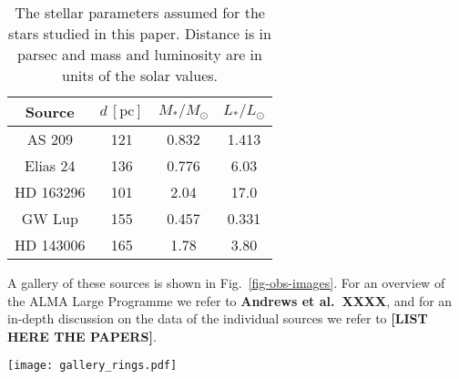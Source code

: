 \documentclass{aa}
\begin{document}
\begin{table}
\begin{center}
\begin{tabular}{|c|ccc|}
\hline
\hline
Source     & $d\,\mathrm{[pc]}$ & $M_{*}/M_{\odot}$ & $L_{*}/L_{\odot}$ \\
\hline
AS 209     & 121              & 0.832        &  1.413 \\ %
Elias 24   & 136              & 0.776        &  6.03  \\ %
HD 163296  & 101              & 2.04         &  17.0  \\ %
GW Lup     & 155              & 0.457        &  0.331 \\ %
HD 143006  & 165              & 1.78        &  3.80 \\  %
\hline
\hline
\end{tabular}
\end{center}
\caption{\label{tab-stellar-params}The stellar parameters assumed for the
  stars studied in this paper. Distance is in parsec and mass and luminosity
  are in units of the solar values.}
\end{table}


A gallery of these sources is shown in Fig.~\ref{fig-obs-images}.
For an overview of the ALMA Large Programme we refer to {\bf Andrews et
  al.~XXXX}, and for an in-depth discussion on the data of the individual
sources we refer to {\bf [LIST HERE THE PAPERS]}.

\begin{figure*}
\centerline{\texttt{[image: gallery\_rings.pdf]}}
\caption{\label{fig-obs-images}The continuum maps in
  band 6 of the five disks in our sample which have the most pronounced rings.
  The eight highest contrast rings, which are the topic of this paper,
  are marked in the images. For a detailed description of these
  data, see {\bf Guzm\'an et al.~(2018)} for AS 209, {\bf XXXX}}
\end{figure*}
\end{document}
